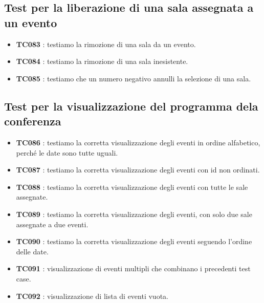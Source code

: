 \documentclass[11pt]{scrartcl} %
\begin{document}
\subsection{Test per la liberazione di una sala assegnata a un evento}

\begin{itemize}

	\item \textbf{TC083} : testiamo la rimozione di una sala da un evento.

	\item \textbf{TC084} : testiamo la rimozione di una sala inesistente.

	\item \textbf{TC085} : testiamo che un numero negativo annulli la selezione di una sala.

\end{itemize}


\subsection{Test per la visualizzazione del programma dela conferenza}

\begin{itemize}


	\item \textbf{TC086} : testiamo la corretta visualizzazione degli eventi in ordine alfabetico, perché le date sono tutte uguali.

	\item \textbf{TC087} : testiamo la corretta visualizzazione degli eventi con id non ordinati.

	\item \textbf{TC088} : testiamo la corretta visualizzazione degli eventi con tutte le sale assegnate.

	\item \textbf{TC089} : testiamo la corretta visualizzazione degli eventi, con solo due sale assegnate a due eventi.

	\item \textbf{TC090} : testiamo la corretta visualizzazione degli eventi seguendo l'ordine delle date.

	\item \textbf{TC091} : visualizzazione di eventi multipli che combinano i precedenti test case.

	\item \textbf{TC092} : visualizzazione di lista di eventi vuota.
\end{itemize}

\end{document}
